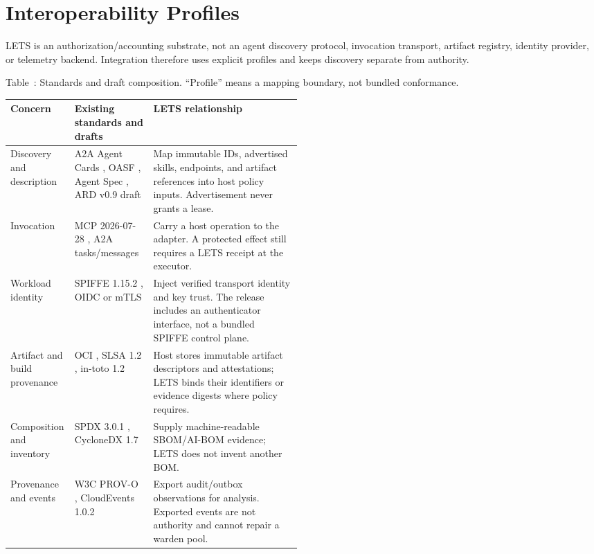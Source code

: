 \documentclass[10pt]{article}
\newcommand{\LETS}{\textsc{LETS}}
\begin{document}
\section{Interoperability Profiles}

\LETS{} is an authorization/accounting substrate, not an agent discovery protocol, invocation
transport, artifact registry, identity provider, or telemetry backend. Integration therefore uses
explicit profiles and keeps discovery separate from authority.

\begin{center}
\label{tab:standards}
\small
Table~\thetable: Standards and draft composition. ``Profile'' means a mapping boundary, not bundled conformance.
\par\smallskip
\begin{tabularx}{\linewidth}{@{}p{0.22\linewidth}p{0.27\linewidth}X@{}}
\toprule
Concern & Existing standards and drafts & LETS relationship \\
\midrule
Discovery and description & A2A Agent Cards \citep{a2a2026}, OASF \citep{oasf2026}, Agent Spec \citep{benajiba2025agentspec}, ARD v0.9 draft \citep{ard2026} & Map immutable IDs, advertised skills, endpoints, and artifact references into host policy inputs. Advertisement never grants a lease. \\
\addlinespace
Invocation & MCP 2026-07-28 \citep{mcp2026}, A2A tasks/messages \citep{a2a2026} & Carry a host operation to the adapter. A protected effect still requires a LETS receipt at the executor. \\
\addlinespace
Workload identity & SPIFFE 1.15.2 \citep{spiffe2026}, OIDC or mTLS & Inject verified transport identity and key trust. The release includes an authenticator interface, not a bundled SPIFFE control plane. \\
\addlinespace
Artifact and build provenance & OCI \citep{oci2025}, SLSA 1.2 \citep{slsa2025}, in-toto 1.2 \citep{intoto2026} & Host stores immutable artifact descriptors and attestations; LETS binds their identifiers or evidence digests where policy requires. \\
\addlinespace
Composition and inventory & SPDX 3.0.1 \citep{spdx2024}, CycloneDX 1.7 \citep{cyclonedx2025} & Supply machine-readable SBOM/AI-BOM evidence; LETS does not invent another BOM. \\
\addlinespace
Provenance and events & W3C PROV-O \citep{w3cprov2013}, CloudEvents 1.0.2 \citep{cloudevents2022} & Export audit/outbox observations for analysis. Exported events are not authority and cannot repair a warden pool. \\
\bottomrule
\end{tabularx}
\end{center}
\end{document}
